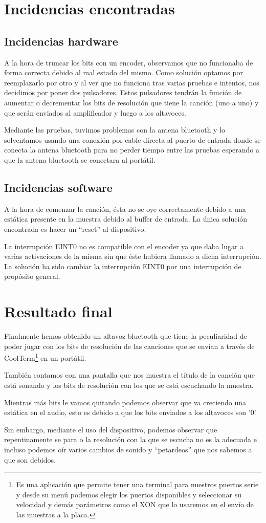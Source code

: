 \documentclass{book}
\begin{document}
\chapter{Incidencias encontradas}
\section{Incidencias hardware}
A la hora de truncar los bits con un encoder, observamos que no funcionaba de forma correcta debido al mal estado del mismo. Como solución optamos por reemplazarlo por otro y al ver que no funciona tras varias pruebas e intentos, nos decidimos por poner dos pulsadores. Estos pulsadores tendrán la función de aumentar o decrementar los bits de resolución que tiene la canción (uno a uno) y que serán enviados al amplificador y luego a los altavoces.

Mediante las pruebas, tuvimos problemas con la antena bluetooth y lo solventamos usando una conexión por cable directa al puerto de entrada donde se conecta la antena bluetooth para no perder tiempo entre las pruebas esperando a que la antena bluetooth se conectara al portátil.

\section{Incidencias software}
A la hora de comenzar la canción, ésta no se oye correctamente debido a una estática presente en la muestra debido al buffer de entrada. La única solución encontrada es hacer un ``reset'' al dispositivo.

La interrupción EINT0 no es compatible con el encoder ya que daba lugar a varias activaciones de la misma sin que éste hubiera llamado a dicha interrupción. La solución ha sido cambiar la interrupción EINT0 por una interrupción de propósito general.


\chapter{Resultado final}
Finalmente hemos obtenido un altavoz bluetooth que tiene la peculiaridad de poder jugar con los bits de resolución de las canciones que se envían a través de CoolTerm\footnote{Es una aplicación que permite tener una terminal para nuestros puertos serie y desde su menú podemos elegir los puertos disponibles y seleccionar su velocidad y demás parámetros como el XON que lo usaremos en el envío de las muestras a la placa.} en un portátil.

También contamos con una pantalla que nos muestra el título de la canción que está sonando y los bits de resolución con los que se está escuchando la muestra.

Mientras más bits le vamos quitando podemos observar que va creciendo una estática en el audio, esto es debido a que los bits enviados a los altavoces son '0'.

Sin embargo, mediante el uso del dispositivo, podemos observar que repentinamente se para o la resolución con la que se escucha no es la adecuada e incluso podemos oír varios cambios de sonido y ``petardeos'' que nos sabemos a que son debidos.
	
\end{document}
